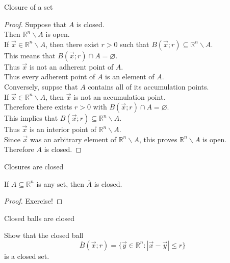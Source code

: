 \documentclass{beamer}
\begin{document}
\begin{frame}{Closure of a set}
\begin{proof}
Suppose that $A$ is closed.\\
\pause
Then $\mathbb{R}^n\backslash A$ is open.\\
\pause
If $\vec x\in \mathbb{R}^n\backslash A$, then there exist $r > 0$ such that $B(\vec x; r)\subseteq \mathbb{R}^n\backslash A$.\\
\pause
This means that $B(\vec x; r)\cap A = \varnothing$.\\
\pause
Thus $\vec x$ is not an adherent point of $A$.\\
\pause
Thus every adherent point of $A$ is an element of $A$.\\
\pause
Conversely, suppse that $A$ contains all of its accumulation points.\\
\pause
If $\vec x\in \mathbb R^n\backslash A$, then $\vec x$ is not an accumulation point.\\
\pause
Therefore there exists $r > 0$ with $B(\vec x; r)\cap A = \varnothing$.\\
\pause
This implies that $B(\vec x; r)\subseteq \mathbb R^n\backslash A$.\\
\pause
Thus $\vec x$ is an interior point of $\mathbb R^n\backslash A$.\\
\pause
Since $\vec x$ was an arbitrary element of $\mathbb R^n\backslash A$, this proves $\mathbb R^n\backslash A$ is open.\\
\pause
Therefore $A$ is closed.
\end{proof}
\end{frame}

\begin{frame}{Closures are closed}
\begin{thm}
If $A\subseteq \mathbb{R}^n$ is any set, then $\overline{A}$ is closed.
\end{thm}
\begin{proof}
Exercise!
\end{proof}
\end{frame}

\begin{frame}{Closed balls are closed}
\begin{prob}
Show that the closed ball
$$\overline B(\vec x; r) = \{\vec y\in \mathbb{R}^n: |\vec x-\vec y| \leq r\}$$
is a closed set.
\end{prob}
\end{frame}
\end{document}
